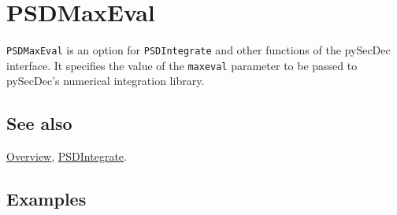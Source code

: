 \documentclass[../FeynHelpersManual.tex]{subfiles}
\begin{document}
\hypertarget{psdmaxeval}{
\section{PSDMaxEval}\label{psdmaxeval}}

\texttt{PSDMaxEval} is an option for \texttt{PSDIntegrate} and other
functions of the pySecDec interface. It specifies the value of the
\texttt{maxeval} parameter to be passed to pySecDec's numerical
integration library.

\subsection{See also}

\hyperlink{toc}{Overview}, \hyperlink{psdintegrate}{PSDIntegrate}.

\subsection{Examples}
\end{document}
